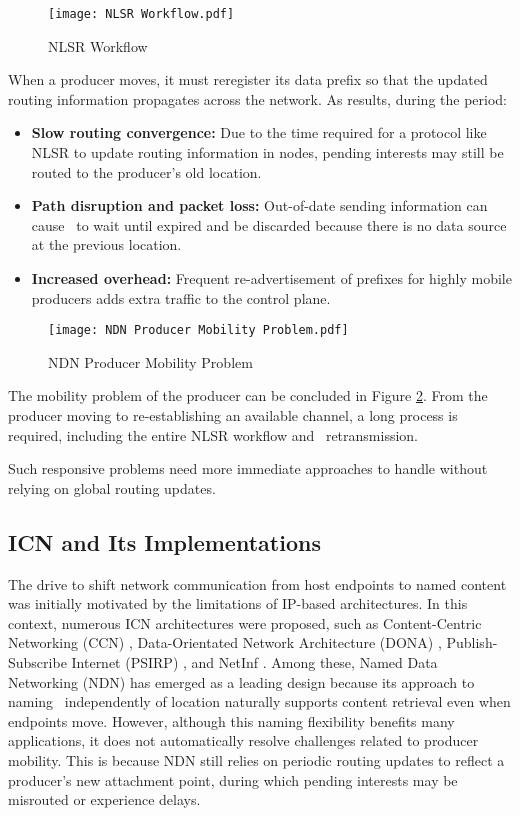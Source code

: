 \begin{figure}[t]
    \centering
    \texttt{[image: NLSR Workflow.pdf]}
    \caption{NLSR Workflow}
    \label{NLSR Workflow}
\end{figure}

When a producer moves, it must reregister its data prefix so that the updated routing information propagates across the network. As results, during the period:

\begin{itemize}
    \item \textbf{Slow routing convergence:} Due to the time required for a protocol like NLSR to update routing information in nodes, pending interests may still be routed to the producer's old location.
    \item \textbf{Path disruption and packet loss:} Out-of-date sending information can cause \InterestPackets\ to wait until expired and be discarded because there is no data source at the previous location.
    \item \textbf{Increased overhead:} Frequent re-advertisement of prefixes for highly mobile producers adds extra traffic to the control plane.
\end{itemize}

\begin{figure}[t]
    \centering
    \texttt{[image: NDN Producer Mobility Problem.pdf]}
    \caption{NDN Producer Mobility Problem}
    \label{NDN Producer Mobility Problem}
\end{figure}

The mobility problem of the producer can be concluded in Figure \ref{NDN Producer Mobility Problem}. From the producer moving to re-establishing an available channel, a long process is required, including the entire NLSR workflow and \InterestPacket\ retransmission.

Such responsive problems need more immediate approaches to handle without relying on global routing updates.

\subsection{ICN and Its Implementations}
The drive to shift network communication from host endpoints to named content was initially motivated by the limitations of IP-based architectures. In this context, numerous ICN architectures were proposed, such as Content-Centric Networking (CCN) \cite{Oehlmann-13}, Data-Orientated Network Architecture (DONA) \cite{Koponen-07}, Publish-Subscribe Internet (PSIRP) \cite{Lagutin-10}, and NetInf \cite{Xylomenos-14}. Among these, Named Data Networking (NDN) \cite{Zhang-14} has emerged as a leading design because its approach to naming \DataPackets\ independently of location naturally supports content retrieval even when endpoints move. However, although this naming flexibility benefits many applications, it does not automatically resolve challenges related to producer mobility. This is because NDN still relies on periodic routing updates to reflect a producer's new attachment point, during which pending interests may be misrouted or experience delays.


